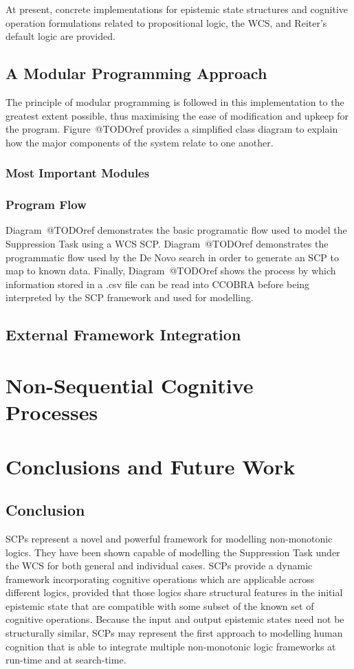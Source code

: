 \documentclass[
11pt, %
english, %
singlespacing, %
headsepline, %
]{MastersDoctoralThesis} %
\begin{document}
At present, concrete implementations for epistemic state structures and cognitive operation formulations related to propositional logic, the WCS, and Reiter's default logic are provided.

\section{A Modular Programming Approach}
The principle of modular programming is followed in this implementation to the greatest extent possible, thus maximising the ease of modification and upkeep for the program. Figure~@TODOref provides a simplified class diagram to explain how the major components of the system relate to one another.

\subsection{Most Important Modules}

\subsection{Program Flow}
Diagram~@TODOref demonstrates the basic programatic flow used to model the Suppression Task using a WCS SCP. Diagram~@TODOref demonstrates the programmatic flow used by the De Novo search in order to generate an SCP to map to known data. Finally, Diagram~@TODOref shows the process by which information stored in a .csv file can be read into CCOBRA before being interpreted by the SCP framework and used for modelling.

\section{External Framework Integration}


\chapter{Non-Sequential Cognitive Processes}



\chapter{Conclusions and Future Work}
\section{Conclusion}
SCPs represent a novel and powerful framework for modelling non-monotonic logics. They have been shown capable of modelling the Suppression Task under the WCS for both general and individual cases. SCPs provide a dynamic framework incorporating cognitive operations which are applicable across different logics, provided that those logics share structural features in the initial epistemic state that are compatible with some subset of the known set of cognitive operations. Because the input and output epistemic states need not be structurally similar, SCPs may represent the first approach to modelling human cognition that is able to integrate multiple non-monotonic logic frameworks at run-time and at search-time. 
\end{document}
